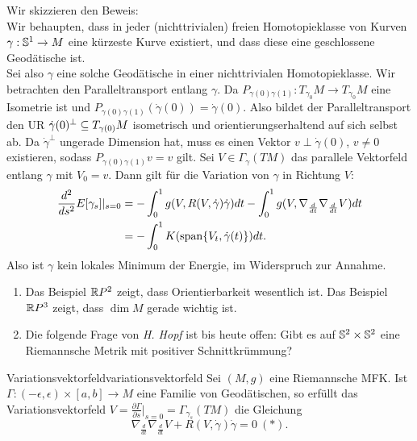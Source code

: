 \begin{beweis}
Wir skizzieren den Beweis:\\
Wir behaupten, dass in jeder (nichttrivialen) freien Homotopieklasse von Kurven $\gamma: \mathbb{S}^1 \to M$ eine kürzeste Kurve existiert, und dass diese eine geschlossene Geodätische ist.\\
Sei also $\gamma$ eine solche Geodätische in einer nichttrivialen Homotopieklasse. Wir betrachten den Paralleltransport entlang $\gamma$. Da $P_{\gamma(0)\gamma(1)}: T_{\gamma_0}M \to T_{\gamma_0}M$ eine Isometrie ist und $P_{\gamma(0)\gamma(1)} (\dot{\gamma}(0))=\dot{\gamma}(0)$. Also bildet der Paralleltransport den UR $\dot{\gamma}(0)^{\perp} \subseteq T_{\gamma(0)}M$ isometrisch und orientierungserhaltend auf sich selbst ab. Da $\dot{\gamma}^{\perp}$ ungerade Dimension hat, muss es einen Vektor $v \perp \dot{\gamma}(0)$, $v\neq 0$ existieren, sodass $P_{\gamma(0)\gamma(1)}v=v$ gilt. Sei $V \in \Gamma_\gamma (TM)$ das parallele Vektorfeld entlang $\gamma$ mit $V_0=v$. Dann gilt für die Variation von $\gamma$ in Richtung $V$:
\begin{align}
\frac{d^2}{ds^2} E[\gamma_s]|_{s=0} &= - \int_0^1 g(V,R(V,\dot{\gamma})\dot{\gamma})dt - \int_0^1 g(V, \nabla_\frac{d}{dt} \nabla_\frac{d}{dt} V) dt \\
&= - \int_0^1 K(\spn\{ V_t, \dot{\gamma}(t) \})dt.
\end{align}
Also ist $\gamma$ kein lokales Minimum der Energie, im Widerspruch zur Annahme.
\end{beweis}
\begin{bemerkungen}
\begin{enumerate}
\item Das Beispiel $\mathbb{R} P^2$ zeigt, dass Orientierbarkeit wesentlich ist. Das Beispiel $\mathbb{R} P^3$ zeigt, dass $\dim M$ gerade wichtig ist.
\item Die folgende Frage von \emph{H. Hopf} ist bis heute offen: Gibt es auf $\mathbb{S}^2 \times \mathbb{S}^2$ eine Riemannsche Metrik mit positiver Schnittkrümmung?
\end{enumerate}
\end{bemerkungen}
\begin{satz}{Variationsvektorfeld}{variationsvektorfeld}
Sei $(M,g)$ eine Riemannsche MFK. Ist $\Gamma: (-\epsilon, \epsilon) \times [a,b] \to M$ eine Familie von Geodätischen, so erfüllt das Variationsvektorfeld $V= \frac{\partial \Gamma}{\partial s}|_{s=0}=\Gamma_{\gamma_s} (TM)$ die Gleichung
\begin{equation}
\nabla_\frac{d}{dt} \nabla_\frac{d}{dt} V + R(V, \dot{\gamma})\dot{\gamma}=0 \ (\ast).
\end{equation}
\end{satz}
